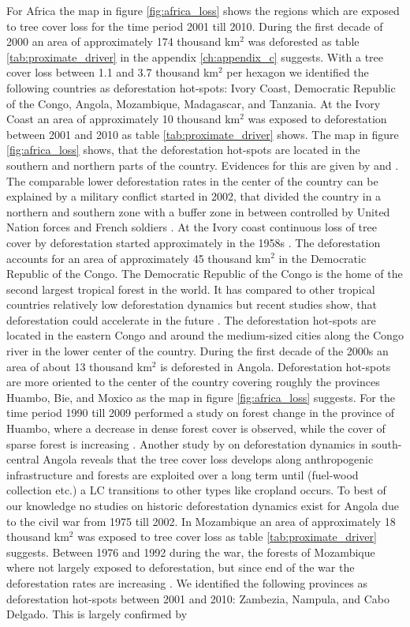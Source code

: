 			For Africa the map in figure \ref{fig:africa_loss} shows the regions which are exposed to tree cover loss for the time period 2001 till 2010. During the first decade of 2000 an area of approximately 174 thousand km$^2$ was deforested as table \ref{tab:proximate_driver} in the appendix \ref{ch:appendix_c} suggests. With a tree cover loss between 1.1 and 3.7 thousand km$^2$ per hexagon we identified the following countries as deforestation hot-spots: Ivory Coast, Democratic Republic of the Congo, Angola, Mozambique, Madagascar, and Tanzania. At the Ivory Coast an area of approximately 10 thousand km$^2$ was exposed to deforestation between 2001 and 2010 as table \ref{tab:proximate_driver} shows. The map in figure \ref{fig:africa_loss} shows, that the deforestation hot-spots are located in the southern and northern parts of the country. Evidences for this are given by \citet{Goetze2006} and \citet{Barima2016}. The comparable lower deforestation rates in the center of the country can be explained by a military conflict started in 2002, that divided the country in a northern and southern zone with a buffer zone in between controlled by United Nation forces and French soldiers \citep{Barima2016}. At the Ivory coast continuous loss of tree cover by deforestation started approximately in the 1958s \citep{Chatelain1996}. The deforestation accounts for an area of approximately 45 thousand km$^2$ in the Democratic Republic of the Congo. The Democratic Republic of the Congo is the home of the second largest tropical forest in the world. It has compared to other tropical countries relatively low deforestation dynamics but recent studies show, that deforestation could accelerate in the future \citep{Ickowitz2015}. The deforestation hot-spots are located in the eastern Congo and around the medium-sized cities along the Congo river in the lower center of the country. During the first decade of the 2000s an area of about 13 thousand km$^2$ is deforested in Angola. Deforestation hot-spots are more oriented to the center of the country covering roughly the provinces Huambo, Bie, and Moxico as the map in figure \ref{fig:africa_loss} suggests. For the time period 1990 till 2009 \citet{Cabral2011} performed a study on forest change in the province of Huambo, where a decrease in dense forest cover is observed, while the cover of sparse forest is increasing \citep{Cabral2011}. Another study by \citet{Schneibel2017} on deforestation dynamics in south-central Angola reveals that the tree cover loss develops along anthropogenic infrastructure and forests are exploited over a long term until (fuel-wood collection etc.) a \ac{LC} transitions to other types like cropland occurs. To best of our knowledge no studies on historic deforestation dynamics exist for Angola due to the civil war from 1975 till 2002. In Mozambique an area of approximately 18 thousand km$^2$ was exposed to tree cover loss as table \ref{tab:proximate_driver} suggests. Between 1976 and 1992 during the war, the forests of Mozambique where not largely exposed to deforestation, but since end of the war the deforestation rates are increasing \citep{Sitoe2012}. We identified the following provinces as deforestation hot-spots between 2001 and 2010: Zambezia, Nampula, and Cabo Delgado. This is largely confirmed by \citeauthor{Sitoe2012} 